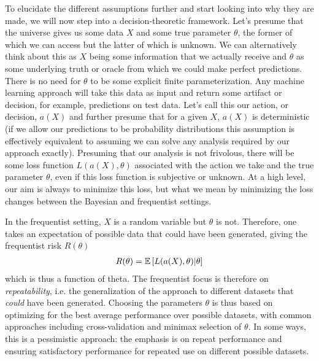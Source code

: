 To elucidate the
different assumptions further and start looking into why they are made, we will now step into a decision-theoretic
framework.  Let's presume that the universe gives us some data $X$ and some true parameter $\theta$, the former of which
we can access but the latter of which is unknown.  We can alternatively think about this as $X$ being some information
that we actually receive and $\theta$ as some underlying truth or oracle from which we could make perfect predictions.  There is
no need for $\theta$ to be some explicit finite parameterization.  Any machine learning approach will take this data as input and
return some artifact or decision, for example, predictions on test data.  Let's call this our action, or decision, $a(X)$
and further presume that for a given $X$, $a(X)$ is deterministic (if we allow our predictions to be probability
distributions this assumption is effectively equivalent to assuming we can solve any analysis required by our approach exactly).
Presuming that our analysis is not frivolous, there will be some loss function $L(a(X),\theta)$ associated with the action we take
and the true parameter $\theta$, even if this loss function is subjective or unknown.  At a high level, our aim is always to
minimize this loss, but what we mean by minimizing the loss changes between the Bayesian and frequentist settings.  

In the
frequentist setting, $X$ is a random variable but $\theta$ is not.  Therefore, one takes an expectation of possible data
that could have been generated, giving the frequentist risk $R(\theta)$~\cite{vapnik1998statistical}
\begin{align}
\label{eq:bayes:freq-risk}
R(\theta)  = \mathbb{E}\left[L(a(X),\theta) | \theta \right]
\end{align}
which is thus a function of theta.
The frequentist focus is therefore on \emph{repeatability}, i.e.
the generalization of the approach to different datasets that \emph{could} have been generated.
Choosing the parameters $\theta$ is thus based on optimizing for the best average performance over possible datasets,
with common approaches including cross-validation and minimax selection of $\theta$.  In some ways, this is a pessimistic
approach: the emphasis is on repeat performance and ensuring satisfactory performance for repeated use on different possible
datasets.  

